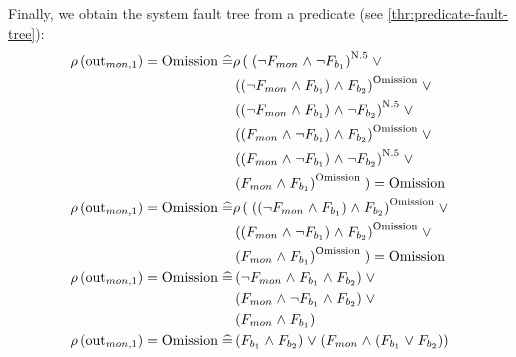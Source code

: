 Finally, we obtain the system fault tree from a predicate (see \cref{thr:predicate-fault-tree}):
\begin{align*}
\rho\left(\mathrm{out}_{mon,1}\right) = \mathrm{Omission} \mathrel{\widehat{=}} &
  \rho\left(\right.
    \left( 
      \neg F_{mon} \mathrel{\wedge} \neg F_{b_1}  
    \right)^{\mathrm{N}.5} \mathrel{\vee} \\
    & \left(
      \left(\neg F_{mon} \mathrel{\wedge} F_{b_1}\right) \mathrel{\wedge} F_{b_2} 
    \right)^{\mathrm{Omission} } \mathrel{\vee}  \\
    & \left(
      \left(\neg F_{mon} \mathrel{\wedge} F_{b_1}\right) \mathrel{\wedge} \neg F_{b_2}
    \right)^{\mathrm{N}.5} \mathrel{\vee} \\ 
    & \left(
      \left(F_{mon} \mathrel{\wedge} \neg F_{b_1}\right) \mathrel{\wedge} F_{b_2}
    \right)^{\mathrm{Omission}} \mathrel{\vee} \\
    & \left(
      \left(F_{mon} \mathrel{\wedge} \neg F_{b_1} \right) \mathrel{\wedge} \neg F_{b_2}
    \right)^{\mathrm{N}.5} \mathrel{\vee} \\
    & \left(
      F_{mon} \mathrel{\wedge} F_{b_1}
    \right)^{\mathrm{Omission}}
  \left.\right) = \mathrm{Omission}\\
\rho\left(\mathrm{out}_{mon,1}\right) = \mathrm{Omission} \mathrel{\widehat{=}} &
  \rho\left(\right.
    \left(
      \left(\neg F_{mon} \mathrel{\wedge} F_{b_1}\right) \mathrel{\wedge} F_{b_2} 
    \right)^{\mathrm{Omission} } \mathrel{\vee} \\  
    & \left(
      \left(F_{mon} \mathrel{\wedge} \neg F_{b_1}\right) \mathrel{\wedge} F_{b_2}
    \right)^{\mathrm{Omission}} \mathrel{\vee} \\
    & \left(
      F_{mon} \mathrel{\wedge} F_{b_1}
    \right)^{\mathrm{Omission}}
  \left.\right) = \mathrm{Omission} \\
\rho\left(\mathrm{out}_{mon,1}\right) = \mathrm{Omission} \mathrel{\widehat{=}} & 
  \left(
    \neg F_{mon} \mathrel{\wedge} F_{b_1} \mathrel{\wedge} F_{b_2} 
  \right) \mathrel{\vee} \\  
  & \left(
    F_{mon} \mathrel{\wedge} \neg F_{b_1}\mathrel{\wedge} F_{b_2}
  \right) \mathrel{\vee} \\
  & \left(
    F_{mon} \mathrel{\wedge} F_{b_1}
  \right) \\
\rho\left(\mathrm{out}_{mon,1}\right) = \mathrm{Omission} \mathrel{\widehat{=}} & 
  \left(F_{b_1} \mathrel{\wedge} F_{b_2}\right) \mathrel{\vee}
  \left(F_{mon} \mathrel{\wedge} \left(F_{b_1} \mathrel{\vee} F_{b_2}\right) \right)
\end{align*}





